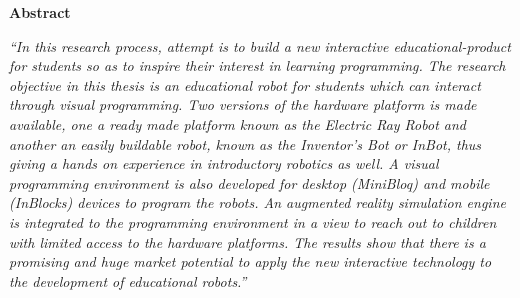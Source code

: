
\begin{center}
\textbf{\large Abstract}
\end{center}

\emph{``In this research process, attempt is to build a new interactive educational-product for students so as to inspire their interest in learning programming. The research objective in this thesis is an educational robot for students which can interact through visual programming. Two versions of the hardware platform is made available, one a ready made platform known as the Electric Ray Robot and another an easily buildable robot, known as the Inventor's Bot or InBot, thus giving a hands on experience in introductory robotics as well. A visual programming environment is also developed for desktop (MiniBloq) and mobile (InBlocks) devices to program the robots. An augmented reality simulation engine is integrated to the programming environment in a view to reach out to children with limited access to the hardware platforms. The results show that there is a promising and huge market potential to apply the new interactive technology to the development of educational robots.''}
